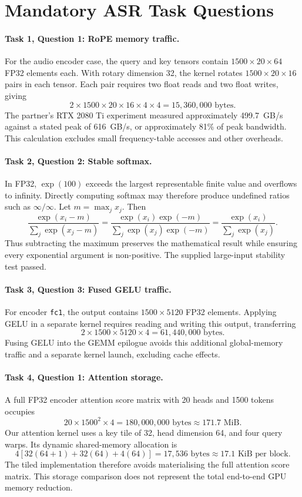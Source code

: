 \section{Mandatory ASR Task Questions}
\label{app:asr_questions}

\paragraph{Task 1, Question 1: RoPE memory traffic.}
For the audio encoder case, the query and key tensors
contain $1500\times20\times64$ FP32 elements each.
With rotary dimension 32, the kernel rotates
$1500\times20\times16$ pairs in each tensor.
Each pair requires two float reads and two float
writes, giving
\[
2\times1500\times20\times16\times4\times4
=15{,}360{,}000\text{ bytes}.
\]
The partner's RTX 2080 Ti experiment measured
approximately 499.7~GB/s against a stated peak
of 616~GB/s, or approximately 81\% of peak
bandwidth. This calculation excludes small
frequency-table accesses and other overheads.

\paragraph{Task 2, Question 2: Stable softmax.}
In FP32, $\exp(100)$ exceeds the largest
representable finite value and overflows to
infinity. Directly computing softmax may
therefore produce undefined ratios such as
$\infty/\infty$.
Let $m=\max_j x_j$. Then
\[
\frac{\exp(x_i-m)}{\sum_j\exp(x_j-m)}
=
\frac{\exp(x_i)\exp(-m)}
{\sum_j\exp(x_j)\exp(-m)}
=
\frac{\exp(x_i)}{\sum_j\exp(x_j)}.
\]
Thus subtracting the maximum preserves the
mathematical result while ensuring every
exponential argument is non-positive.
The supplied large-input stability test passed.

\paragraph{Task 3, Question 3: Fused GELU traffic.}
For encoder \texttt{fc1}, the output contains
$1500\times5120$ FP32 elements. Applying GELU
in a separate kernel requires reading and
writing this output, transferring
\[
2\times1500\times5120\times4
=61{,}440{,}000\text{ bytes}.
\]
Fusing GELU into the GEMM epilogue avoids this
additional global-memory traffic and a separate
kernel launch, excluding cache effects.

\paragraph{Task 4, Question 1: Attention storage.}
A full FP32 encoder attention score matrix
with 20 heads and 1500 tokens occupies
\[
20\times1500^2\times4
=180{,}000{,}000\text{ bytes}
\approx171.7\text{ MiB}.
\]
Our attention kernel uses a key tile of 32,
head dimension 64, and four query warps.
Its dynamic shared-memory allocation is
\[
4[32(64+1)+32(64)+4(64)]
=17{,}536\text{ bytes}
\approx17.1\text{ KiB per block}.
\]
The tiled implementation therefore avoids
materialising the full attention score matrix.
This storage comparison does not represent
the total end-to-end GPU memory reduction.
